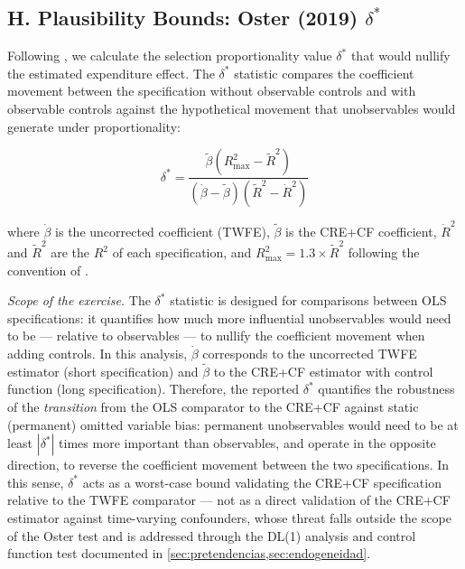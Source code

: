 \subsection*{H. Plausibility Bounds: Oster (2019) $\delta^*$}
\label{sec:appendix_oster}

Following \citet{Oster2019}, we calculate the selection proportionality value $\delta^*$ that would nullify the estimated expenditure effect.
The $\delta^*$ statistic compares the coefficient movement between the specification without observable controls and with observable controls against the hypothetical movement that unobservables would generate under proportionality:

\begin{equation}
  \delta^* = \frac{\tilde{\beta}(R^2_{\max} - \tilde{R}^2)}{(\dot{\beta} - \tilde{\beta})(\tilde{R}^2 - \dot{R}^2)}
  \label{eq:oster}
\end{equation}

\noindent where $\dot{\beta}$ is the uncorrected coefficient (TWFE), $\tilde{\beta}$ is the CRE+CF coefficient,
$\dot{R}^2$ and $\tilde{R}^2$ are the $R^2$ of each specification,
and $R^2_{\max} = 1.3 \times \tilde{R}^2$ following the convention of \citet{Oster2019}.

\textit{Scope of the exercise.}
The \citet{Oster2019} $\delta^*$ statistic is designed for comparisons between OLS specifications: it quantifies how much more influential unobservables would need to be --- relative to observables --- to nullify the coefficient movement when adding controls.
In this analysis, $\dot{\beta}$ corresponds to the uncorrected TWFE estimator (short specification) and $\tilde{\beta}$ to the CRE+CF estimator with control function (long specification).
Therefore, the reported $\delta^*$ quantifies the robustness of the \textit{transition} from the OLS comparator to the CRE+CF against static (permanent) omitted variable bias: permanent unobservables would need to be at least $|\delta^*|$ times more important than observables, and operate in the opposite direction, to reverse the coefficient movement between the two specifications.
In this sense, $\delta^*$ acts as a worst-case bound validating the CRE+CF specification relative to the TWFE comparator --- not as a direct validation of the CRE+CF estimator against time-varying confounders, whose threat falls outside the scope of the Oster test and is addressed through the DL(1) analysis and control function test documented in \cref{sec:pretendencias,sec:endogeneidad}.

